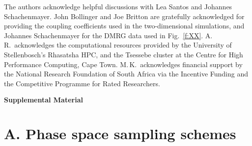 \documentclass[aps,prl,showpacs,amsmath,amssymb,superscriptaddress,reprint,10pt]{revtex4-1}
\begin{document}
The authors acknowledge helpful discussions with Lea Santos and Johannes Schachenmayer. John Bollinger and Joe Britton are gratefully acknowledged for providing the coupling coefficients used in the two-dimensional simulations, and Johannes Schachenmayer for the DMRG data used in Fig.~\ref{f:XX}.
A.\,R.\ acknowledges the computational resources provided by the University of Stellenbosch's Rhasatsha HPC, %
and the Tsessebe cluster at the Centre for High Performance Computing, Cape Town.  %
M.\,K.\ acknowledges financial support by the National Research Foundation of South Africa via the Incentive Funding and the Competitive Programme for Rated Researchers.



\bigskip

\newpage
\hbox{}
\newpage

\begin{center}
{\bf Supplemental Material}  
\end{center}
\vspace{-3mm}
\appendix
{}

\section{A. Phase space sampling schemes}
\setcounter{section}{1}
\setcounter{equation}{0}
\setcounter{figure}{0}
\end{document}
